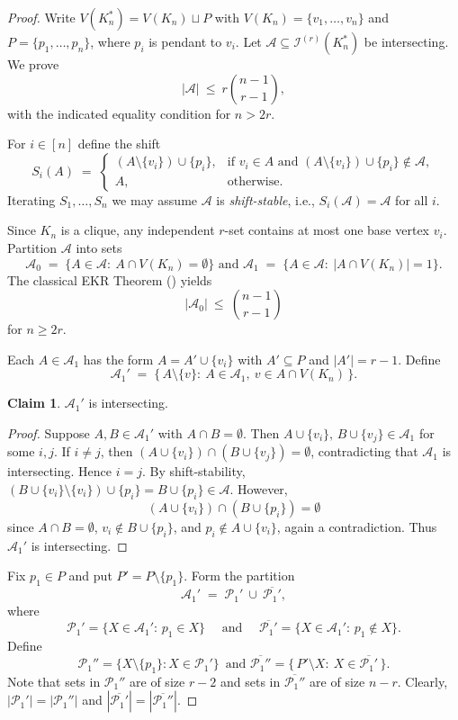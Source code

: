 \documentclass{article}
\theoremstyle{definition}
\newtheorem{claim}{Claim}
\newcommand{\A}{\mathcal{A}}
\newcommand{\I}{\mathcal{I}}
\newcommand{\1}{\mathbf{1}}
\begin{document}
\begin{proof}
Write $V(K_n^*)=V(K_n)\sqcup P$ with $V(K_n)=\{v_1,\dots,v_n\}$ and $P=\{p_1,\dots,p_n\}$, where $p_i$ is pendant to $v_i$. Let $\A\subseteq \I^{(r)}(K_n^*)$ be intersecting. We prove
\[
|\A|\ \le\ r\binom{n-1}{r-1},
\]
with the indicated equality condition for $n>2r$.



For $i\in[n]$ define the shift
\[
S_i(A)\;=\;
\begin{cases}
(A\setminus\{v_i\})\cup\{p_i\}, &\text{if } v_i\in A \text{ and } (A\setminus\{v_i\})\cup\{p_i\}\notin\A,\\
A,&\text{otherwise}.
\end{cases}
\]
Iterating $S_1,\dots,S_n$ we may assume $\A$ is \emph{shift-stable}, i.e., $S_i(\A)=\A$ for all $i$.


Since $K_n$ is a clique, any independent $r$-set contains at most one base vertex $v_i$. Partition $\A$ into sets
\[
\A_0 \;=\; \{A\in\A:\ A\cap V(K_n)=\emptyset\} \text{ and }
\A_1 \;=\; \{A\in\A:\ |A\cap V(K_n)|=1\}.
\]
The classical EKR Theorem (\cite{EKR}) yields
\begin{equation} \label{classicEKR}
|\A_0|\ \le\ \binom{n-1}{r-1}
\end{equation}
for $n\ge 2r$.

Each $A\in\A_1$ has the form $A=A'\cup\{v_i\}$ with $A'\subseteq P$ and $|A'|=r-1$. Define
\[
\A_1' \;=\; \{\,A\setminus\{v\}:\ A\in\A_1,\ v\in A\cap V(K_n)\,\}.
\]



\begin{claim}\label{cl:intersecting}
$\A_1'$ is intersecting.
\end{claim}
\begin{proof}
Suppose $A,B\in \A_1'$ with $A\cap B=\emptyset$. Then $A\cup\{v_i\},\,B\cup\{v_j\}\in \A_1$ for some $i,j$. If $i\ne j$, then $(A\cup\{v_i\})\cap (B\cup\{v_j\})=\emptyset$, contradicting that $\A_1$ is intersecting. Hence $i=j$. By shift-stability, $(B\cup\{v_i\}\setminus\{v_i\})\cup\{p_i\}=B\cup\{p_i\}\in \A$. However,
\[
(A\cup\{v_i\})\cap (B\cup\{p_i\})=\emptyset
\]
since $A\cap B=\emptyset$, $v_i\notin B\cup\{p_i\}$, and $p_i\notin A\cup\{v_i\}$, again a contradiction. Thus $\A_1'$ is intersecting.
\end{proof}

\medskip

Fix $p_1\in P$ and put $P'=P\setminus\{p_1\}$. Form the partition
\[
\A_1'\;=\;\mathcal{P}_1'\ \cup\ \overline{\mathcal{P}_1'},
\]
where
\[
\mathcal{P}_1'=\{X\in \A_1':\,p_1\in X\} \quad \text{ and }
\quad
\overline{\mathcal{P}_1'}=\{X\in \A_1':\,p_1\notin X\}.
\]
Define
\[
\mathcal{P}_1''=\{X\setminus\{p_1\}: X\in \mathcal{P}_1'\}\,
\text{ and }
\overline{\mathcal{P}_1''}=\{\,P'\setminus X:\ X\in \overline{\mathcal{P}_1'}\,\}.
\]
Note that sets in $\mathcal{P}_1''$ are of size $r-2$ and sets in $\overline{\mathcal{P}_1''}$ are of size $n-r$. Clearly, $|\mathcal{P}_1'|=|\mathcal{P}_1''|$ and $|\overline{\mathcal{P}_1'}|=|\overline{\mathcal{P}_1''}|$.


\end{proof}
\end{document}
